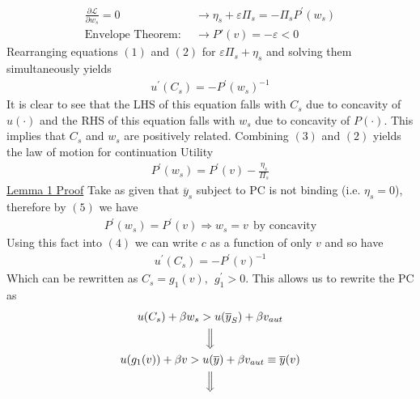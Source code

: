\documentclass{article}
\begin{document}
\begin{itemize}
\begin{itemize}
\begin{itemize}
\begin{align*}
                \frac{\partial \mathcal{L}}{\partial w_{s}} = 0 &\rightarrow \eta_{s} + \varepsilon \Pi_{s} = - \Pi_{s}P^{'}(w_{s}) \tag{(2)} \\
                \text{Envelope Theorem}: \ \ &\rightarrow P'(v) = - \varepsilon < 0 \tag{(3)}
            \end{align*}
            Rearranging equations $(1)$ and $(2)$ for $\varepsilon \Pi_{s} + \eta_{s}$ and solving them simultaneously yields
            \begin{align*}
                u^{'}(C_{s}) = - P^{'}(w_{s})^{-1} \tag{(4)}
            \end{align*}
            It is clear to see that the LHS of this equation falls with $C_{s}$ due to concavity of $u(\cdot)$ and the RHS of this equation falls with $w_{s}$ due to concavity of $P(\cdot)$. This implies that $C_{s}$ and $w_{s}$ are positively related.
            \newline
            Combining $(3)$ and $(2)$ yields the law of motion for continuation Utility
            \begin{align*}
                P^{'}(w_{s}) = P^{'}(v) - \frac{\eta_{s}}{\Pi_{s}} \tag{(5)}
            \end{align*}
            \newline
            \underline{Lemma 1 Proof}
            \newline
            Take as given that $\overline{y}_{s}$ subject to PC is not binding (i.e. $\eta_{s} = 0$), therefore by $(5)$ we have
            \begin{gather*}
                P^{'}(w_{s}) = P^{'}(v) \Rightarrow w_{s} = v \ \ \text{by concavity}
            \end{gather*}
            Using this fact into $(4)$ we can write $c$ as a function of only $v$ and so have
            \begin{gather*}
                u^{'}(C_{s}) = -P^{'} (v)^{-1}
            \end{gather*}
            Which can be rewritten as $C_{s} = g_{1}(v), \ \ g_{1}^{'} > 0$. This allows us to rewrite the PC as
            \begin{gather*}
                u(C_{s}) + \beta w_{s} > u(\overline{y}_{S}) + \beta v_{aut} \\
                \Big\Downarrow \\
                u(g_{1}(v)) + \beta v > u(\overline{y}) + \beta v_{aut} \equiv \overline{y}(v) \\
                \Big\Downarrow \\

\end{gather*}
\end{itemize}
\end{itemize}
\end{itemize}
\end{document}
